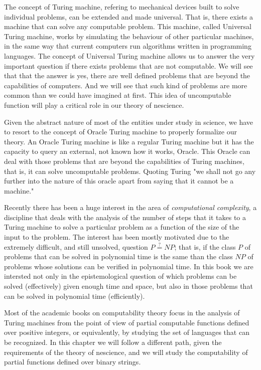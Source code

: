 The concept of Turing machine, refering to mechanical devices built to solve individual problems, can be extended and made universal. That is, there exists a machine that can solve any computable problem. This machine, called Universal Turing machine, works by simulating the behaviour of other particular machines, in the same way that current computers run algorithms written in programming languages. The concept of Universal Turing machine allows us to answer the very important question if there exists problems that are not computable. We will see that that the answer is yes, there are well defined problems that are beyond the capabilities of computers. And we will see that such kind of problems are more common than we could have imagined at first. This idea of uncomputable function will play a critical role in our theory of nescience.

Given the abstract nature of most of the entities under study in science, we have to resort to the concept of Oracle Turing machine to properly formalize our theory. An Oracle Turing machine is like a regular Turing machine but it has the capacity to query an external, not known how it works, Oracle. This Oracle can deal with those problems that are beyond the capabilities of Turing machines, that is, it can solve uncomputable problems. Quoting Turing "we shall not go any further into the nature of this oracle apart from saying that it
cannot be a machine."

Recently there has been a huge interest in the area of \emph{computational complexity}, a discipline that deals with the analysis of the number of steps that it takes to a Turing machine to solve a particular problem as a function of the size of the input to the problem. The interest has been mostly motivated due to the extremely difficult, and still unsolved, question $P\overset{?}{=}NP$; that is, if the class $P$ of problems that can be solved in polynomial time is the same than the class $NP$ of problems whose solutions can be verified in polynomial time. In this book we are intersted not only in the epistemological question of which problems can be solved (effectively) given enough time and space, but also in those problems that can be solved in polynomial time (efficiently). 

Most of the academic books on computability theory focus in the analysis of Turing machines from the point of view of partial computable functions defined over positive integers, or equivalently, by studying the set of languages that can be recognized. In this chapter we will follow a different path, given the requirements of the theory of nescience, and we will study the computability of partial functions defined over binary strings.

